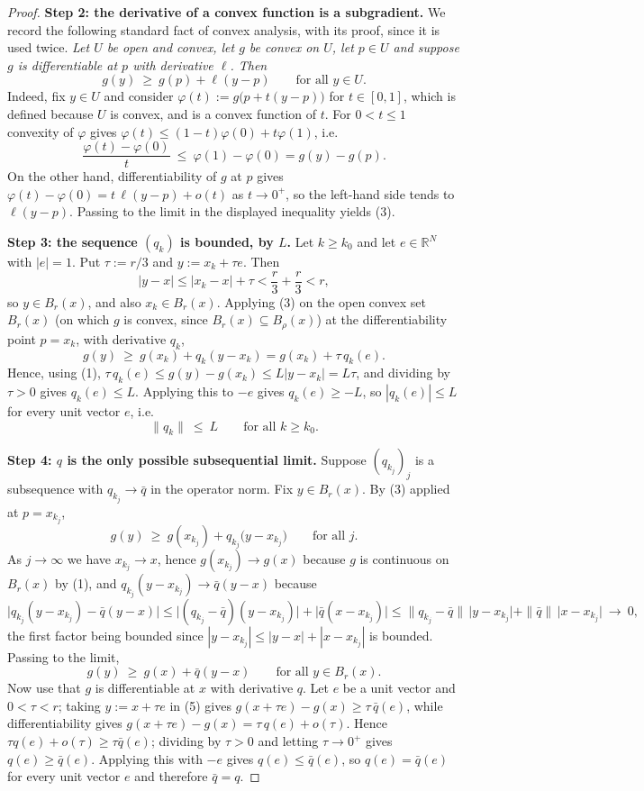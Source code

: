 \begin{proof}
\medskip\noindent\textbf{Step 2: the derivative of a convex function is a subgradient.} We
record the following standard fact of convex analysis, with its proof, since it is used
twice. \emph{Let $U$ be open and convex, let $g$ be convex on $U$, let $p\in U$ and suppose
$g$ is differentiable at $p$ with derivative $\ell$. Then}
\[
 g(y)\ \ge\ g(p)+\ell(y-p)\qquad\text{for all }y\in U. \tag{3}
\]
Indeed, fix $y\in U$ and consider $\varphi(t):=g\big(p+t(y-p)\big)$ for $t\in[0,1]$, which is
defined because $U$ is convex, and is a convex function of $t$. For $0<t\le1$ convexity of
$\varphi$ gives $\varphi(t)\le(1-t)\varphi(0)+t\varphi(1)$, i.e.
\[
 \frac{\varphi(t)-\varphi(0)}{t}\ \le\ \varphi(1)-\varphi(0)=g(y)-g(p).
\]
On the other hand, differentiability of $g$ at $p$ gives
$\varphi(t)-\varphi(0)=t\,\ell(y-p)+o(t)$ as $t\to0^{+}$, so the left-hand side tends to
$\ell(y-p)$. Passing to the limit in the displayed inequality yields (3).

\medskip\noindent\textbf{Step 3: the sequence $(q_k)$ is bounded, by $L$.} Let $k\ge k_0$ and
let $e\in\mathbb R^{N}$ with $|e|=1$. Put $\tau:=r/3$ and $y:=x_k+\tau e$. Then
\[
 |y-x|\le|x_k-x|+\tau<\frac r3+\frac r3<r ,
\]
so $y\in B_r(x)$, and also $x_k\in B_r(x)$. Applying (3) on the open convex set $B_r(x)$
(on which $g$ is convex, since $B_r(x)\subseteq B_\rho(x)$) at the differentiability point
$p=x_k$, with derivative $q_k$,
\[
 g(y)\ \ge\ g(x_k)+q_k(y-x_k)=g(x_k)+\tau\,q_k(e).
\]
Hence, using (1), $\tau\,q_k(e)\le g(y)-g(x_k)\le L|y-x_k|=L\tau$, and dividing by $\tau>0$
gives $q_k(e)\le L$. Applying this to $-e$ gives $q_k(e)\ge-L$, so $|q_k(e)|\le L$ for every
unit vector $e$, i.e.
\[
 \|q_k\|\ \le\ L\qquad\text{for all }k\ge k_0. \tag{4}
\]

\medskip\noindent\textbf{Step 4: $q$ is the only possible subsequential limit.} Suppose
$(q_{k_j})_j$ is a subsequence with $q_{k_j}\to\bar q$ in the operator norm. Fix
$y\in B_r(x)$. By (3) applied at $p=x_{k_j}$,
\[
 g(y)\ \ge\ g(x_{k_j})+q_{k_j}\big(y-x_{k_j}\big)\qquad\text{for all }j .
\]
As $j\to\infty$ we have $x_{k_j}\to x$, hence $g(x_{k_j})\to g(x)$ because $g$ is continuous
on $B_r(x)$ by (1), and $q_{k_j}(y-x_{k_j})\to\bar q(y-x)$ because
\[
 \big|q_{k_j}(y-x_{k_j})-\bar q(y-x)\big|
  \le\big|(q_{k_j}-\bar q)(y-x_{k_j})\big|+\big|\bar q(x-x_{k_j})\big|
  \le\|q_{k_j}-\bar q\|\,\big|y-x_{k_j}\big|+\|\bar q\|\,\big|x-x_{k_j}\big|\ \to\ 0,
\]
the first factor being bounded since $|y-x_{k_j}|\le|y-x|+|x-x_{k_j}|$ is bounded. Passing to
the limit,
\[
 g(y)\ \ge\ g(x)+\bar q(y-x)\qquad\text{for all }y\in B_r(x). \tag{5}
\]
Now use that $g$ is differentiable at $x$ with derivative $q$. Let $e$ be a unit vector and
$0<\tau<r$; taking $y:=x+\tau e$ in (5) gives
$g(x+\tau e)-g(x)\ge\tau\,\bar q(e)$, while differentiability gives
$g(x+\tau e)-g(x)=\tau\,q(e)+o(\tau)$. Hence $\tau q(e)+o(\tau)\ge\tau\bar q(e)$; dividing by
$\tau>0$ and letting $\tau\to0^{+}$ gives $q(e)\ge\bar q(e)$. Applying this with $-e$ gives
$q(e)\le\bar q(e)$, so $q(e)=\bar q(e)$ for every unit vector $e$ and therefore
$\bar q=q$.


\end{proof}
